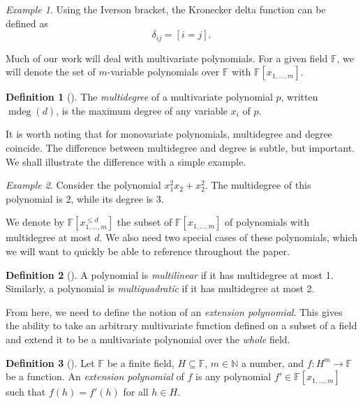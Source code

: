 \documentclass[english,12pt]{reedthesis}
\theoremstyle{plain}
\theoremstyle{definition}
\newtheorem{defn}[defn]{Definition}
\theoremstyle{remark}
\newtheorem{example}{Example}[thm]
\DeclareMathOperator{\mdeg}{mdeg}
\begin{document}
\begin{example}
  Using the Iverson bracket, the Kronecker delta function can be defined as
  \[
    \delta_{ij} = [i = j].
  \]
\end{example}

Much of our work will deal with multivariate polynomials. For a given field
$\mathbb{F}$, we will denote the set of $m$-variable polynomials over
$\mathbb{F}$ with $\mathbb{F}[x_{1, \ldots, m}]$.

\begin{defn}[{\cite[8]{AW09}}]\label{def:mdeg}
  The \emph{multidegree} of a multivariate polynomial $p$, written $\mdeg(d)$,
  is the maximum degree of any variable $x_{i}$ of $p$.
\end{defn}

It is worth noting that for monovariate polynomials, multidegree and degree
coincide. The difference between multidegree and degree is subtle, but
important. We shall illustrate the difference with a simple example.

\begin{example}
  Consider the polynomial $x_{1}^{2}x_{2} + x_{2}^{2}$. The multidegree of this
  polynomial is 2, while its degree is 3.
\end{example}

We denote by $\mathbb{F}[x_{1, \ldots, m}^{\le d}]$ the subset of
$\mathbb{F}[x_{1, \ldots, m}]$ of polynomials with multidegree at most $d$. We also
need two special cases of these polynomials, which we will want to quickly be
able to reference throughout the paper.

\begin{defn}[{\cite[8]{AW09}}]\label{def:mlin}
  A polynomial is \emph{multilinear} if it has multidegree at most 1. Similarly,
  a polynomial is \emph{multiquadratic} if it has multidegree at most 2.
\end{defn}

From here, we need to define the notion of an \emph{extension polynomial}. This
gives the ability to take an arbitrary multivariate function defined on a subset
of a field and extend it to be a multivariate polynomial over the \emph{whole}
field.

\begin{defn}[{\cite[8]{AW09}}]\label{def:ext-poly}
  Let $\mathbb{F}$ be a finite field, $H \subseteq \mathbb{F}$, $m \in \mathbb{N}$ a number, and
  $f: H^{m} \rightarrow \mathbb{F}$ be a function. An \emph{extension polynomial} of $f$
  is any polynomial $f' \in \mathbb{F}[x_{1, \ldots, m}]$ such that $f(h) = f'(h)$ for
  all $h \in H$.
\end{defn}
\end{document}
